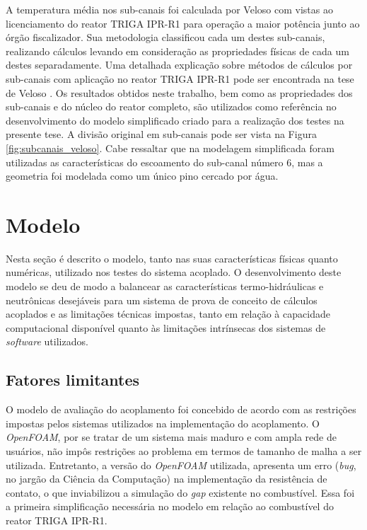 A temperatura média nos sub-canais foi calculada por Veloso \cite[Capítulo~8]{Veloso2005} com vistas ao licenciamento
do reator TRIGA IPR-R1 para operação a maior potência junto ao órgão fiscalizador. Sua metodologia
classificou cada um destes sub-canais, realizando cálculos levando
em consideração as propriedades físicas de cada um destes separadamente. Uma detalhada
explicação sobre métodos de cálculos por sub-canais com aplicação no reator TRIGA IPR-R1
pode ser encontrada na tese de Veloso \cite{Veloso2004}. Os resultados obtidos neste
trabalho, bem como as propriedades dos sub-canais e do núcleo do reator completo, são utilizados
como referência no desenvolvimento do modelo simplificado criado para a realização dos testes na
presente tese. A divisão original em sub-canais pode ser vista na Figura \ref{fig:subcanais_veloso}. Cabe
ressaltar que na modelagem simplificada foram utilizadas as características do escoamento do
sub-canal número $6$, mas a geometria foi modelada como um único pino cercado por água.

\section{Modelo}
%
%

Nesta seção é descrito o modelo, tanto nas suas características físicas quanto numéricas, utilizado
nos testes do sistema acoplado.
O desenvolvimento deste modelo se deu de modo a balancear as características termo-hidráulicas
e neutrônicas desejáveis para um sistema de prova de conceito de cálculos acoplados
e as limitações técnicas impostas, tanto em relação à capacidade computacional disponível quanto
às limitações intrínsecas dos sistemas de \textit{software} utilizados.

\subsection{Fatores limitantes}
\label{ssec:lim}

O modelo de avaliação do acoplamento foi concebido de acordo com as restrições impostas pelos sistemas
utilizados na implementação do acoplamento. O \textit{OpenFOAM}, por se tratar de um sistema mais maduro
e com ampla rede de usuários, não impôs
restrições ao problema em termos de tamanho de malha a ser utilizada. Entretanto, a versão
do \textit{OpenFOAM} utilizada,
apresenta um erro (\textit{bug}, no jargão da Ciência da Computação) na implementação da resistência
de contato, o que inviabilizou a simulação do \textit{gap} existente no combustível. Essa foi a
primeira simplificação necessária no modelo em relação ao combustível do reator TRIGA IPR-R1.

